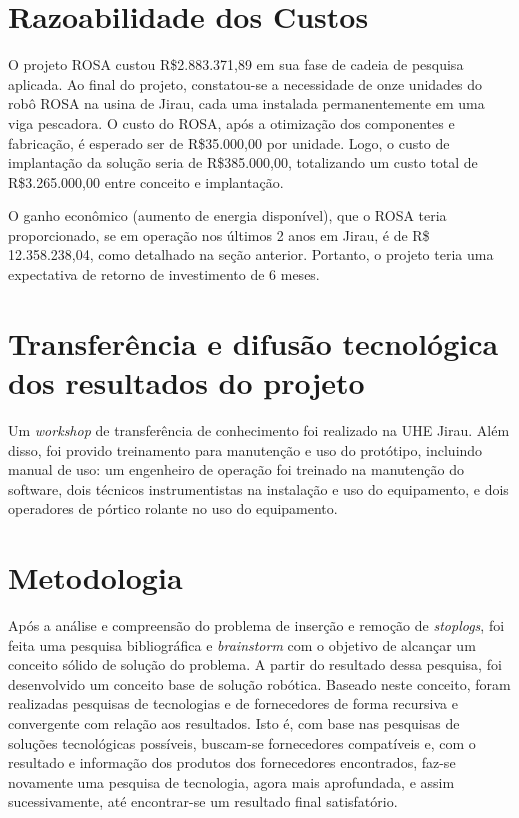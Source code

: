  
     
\section{Razoabilidade dos Custos}
O projeto ROSA custou R\$2.883.371,89 em sua fase de cadeia de pesquisa
aplicada. Ao final do projeto, constatou-se a necessidade de onze unidades 
do robô ROSA na usina de Jirau, cada uma instalada permanentemente em uma viga
pescadora.
O custo do ROSA, após a otimização dos componentes e fabricação, é esperado ser de
R\$35.000,00 por unidade. Logo, o custo de implantação da solução seria de
R\$385.000,00, totalizando um custo total de R\$3.265.000,00 entre conceito e
implantação.

O ganho econômico (aumento de energia disponível), que o ROSA teria
proporcionado, se em operação nos últimos 2 anos em Jirau, é de R\$
12.358.238,04, como detalhado na seção anterior. Portanto, o projeto teria uma
expectativa de retorno de investimento de 6 meses.

\section{Transferência e difusão tecnológica dos resultados do projeto}
Um \textit{workshop} de transferência de conhecimento foi realizado na UHE
Jirau. Além disso, foi provido treinamento para manutenção e uso do protótipo,
incluindo  manual de uso: um engenheiro de operação foi treinado na 
manutenção do software, dois técnicos instrumentistas na instalação e uso do
equipamento, e dois operadores de pórtico rolante no uso do equipamento.

\section{Metodologia}

Após a análise e compreensão do problema de inserção e remoção de
\textit{stoplogs}, foi feita uma pesquisa bibliográfica e \textit{brainstorm}
com o objetivo de alcançar um conceito sólido de solução do problema. A partir
do resultado dessa pesquisa, foi desenvolvido um conceito base de solução robótica. 
Baseado neste conceito, foram realizadas pesquisas de tecnologias e de fornecedores 
de forma recursiva e convergente com relação aos resultados. Isto é, com base
nas pesquisas de soluções tecnológicas possíveis, buscam-se fornecedores
compatíveis e, com o resultado e informação dos produtos dos fornecedores
encontrados, faz-se novamente uma pesquisa de tecnologia, agora mais
aprofundada, e assim sucessivamente, até encontrar-se um resultado final
satisfatório.

